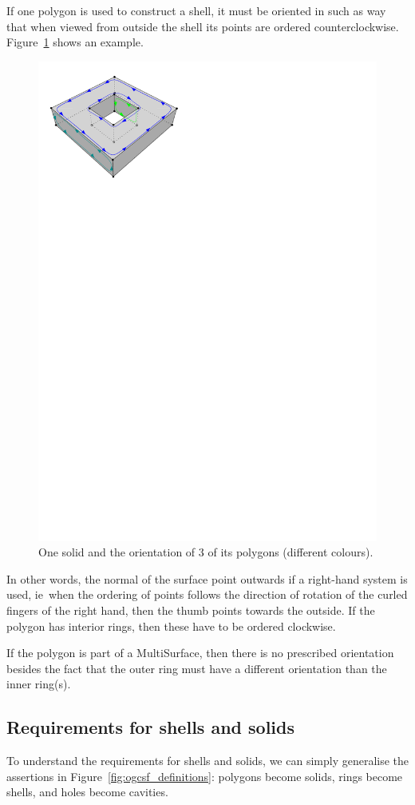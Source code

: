 \documentclass[a4paper,parskip=half,11pt]{scrartcl}
\newcommand{\ie}{ie}
\begin{document}
If one polygon is used to construct a shell, it must be oriented in such as way that when viewed from outside the shell its points are ordered counterclockwise.
Figure~\ref{fig:orientation} shows an example.
\begin{figure}
  \centering
  \includegraphics[width=0.65\linewidth]{figs/orientation.pdf}
  \caption{One solid and the orientation of 3 of its polygons (different colours).}
\label{fig:orientation}
\end{figure}
In other words, the normal of the surface point outwards if a right-hand system is used, \ie\ when the ordering of points follows the direction of rotation of the curled fingers of the right hand, then the thumb points towards the outside.
If the polygon has interior rings, then these have to be ordered clockwise.

If the polygon is part of a MultiSurface, then there is no prescribed orientation besides the fact that the outer ring must have a different orientation than the inner ring(s).



\subsection{Requirements for shells and solids}

To understand the requirements for shells and solids, we can simply generalise the assertions in Figure~\ref{fig:ogcsf_definitions}: polygons become solids, rings become shells, and holes become cavities.
\end{document}
